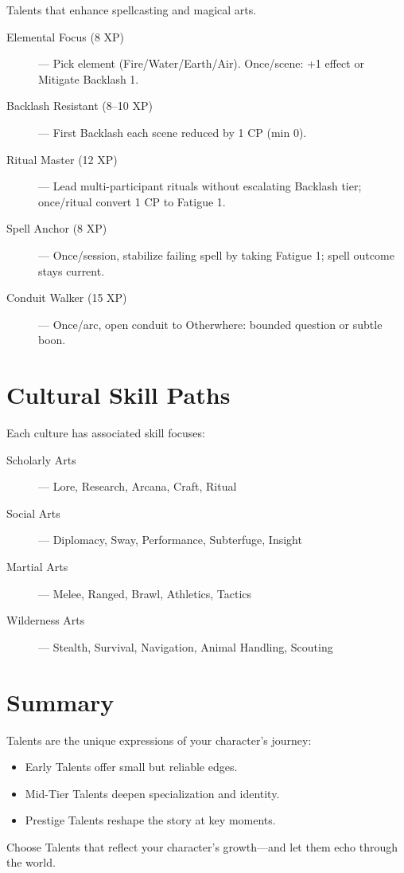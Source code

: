 Talents that enhance spellcasting and magical arts.

\begin{description}
  \item[Elemental Focus (8 XP)] — Pick element (Fire/Water/Earth/Air). Once/scene: +1 effect or Mitigate Backlash 1.
  \item[Backlash Resistant (8–10 XP)] — First Backlash each scene reduced by 1 CP (min 0).
  \item[Ritual Master (12 XP)] — Lead multi-participant rituals without escalating Backlash tier; once/ritual convert 1 CP to Fatigue 1.
  \item[Spell Anchor (8 XP)] — Once/session, stabilize failing spell by taking Fatigue 1; spell outcome stays current.
  \item[Conduit Walker (15 XP)] — Once/arc, open conduit to Otherwhere: bounded question or subtle boon.
\end{description}

\section{Cultural Skill Paths}

Each culture has associated skill focuses:

\begin{description}
  \item[Scholarly Arts] — Lore, Research, Arcana, Craft, Ritual
  \item[Social Arts] — Diplomacy, Sway, Performance, Subterfuge, Insight
  \item[Martial Arts] — Melee, Ranged, Brawl, Athletics, Tactics
  \item[Wilderness Arts] — Stealth, Survival, Navigation, Animal Handling, Scouting
\end{description}

\section{Summary}

Talents are the unique expressions of your character's journey:

\begin{itemize}
  \item Early Talents offer small but reliable edges.
  \item Mid-Tier Talents deepen specialization and identity.
  \item Prestige Talents reshape the story at key moments.
\end{itemize}

Choose Talents that reflect your character's growth—and let them echo through the world.


